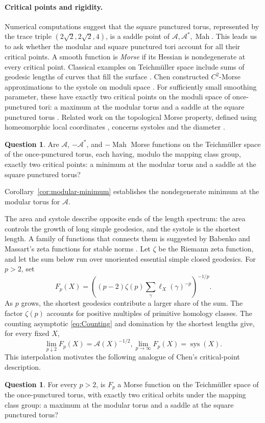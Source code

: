 \documentclass[10pt,twoside]{article}
\theoremstyle{plain}
\theoremstyle{definition}
\newtheorem{question}[theorem]{Question}
\theoremstyle{remark}
\DeclareMathOperator{\sys}{sys}
\newcommand{\A}{\mathcal A}
\begin{document}
\paragraph{Critical points and rigidity.}
Numerical computations suggest that the square punctured
torus, represented by the trace triple $(2\sqrt2,2\sqrt2,4)$,
is a saddle point of $\A,\mathcal A^*,\operatorname{Mah}$.
This leads us to ask whether the modular and square punctured tori
account for all their critical points.
A smooth function is \emph{Morse} if its Hessian is nondegenerate
at every critical point. Classical examples on Teichm\"uller space
include sums of geodesic lengths of curves that fill the surface
\cite{Wolpert1987}.
Chen constructed $C^2$-Morse approximations to the systole on
moduli space \cite{Chen2025Morse}. For sufficiently small smoothing
parameter, these have exactly two critical points on the moduli space
of once-punctured tori: a maximum at the modular torus and a saddle
at the square punctured torus \cite[Section~8.2]{Chen2025Morse}.
Related work on the topological Morse property, defined using
homeomorphic local coordinates \cite{Morse1959}, concerns systoles
\cite{SchmutzSchaller1999,Akrout2003} and the diameter
\cite{IrmerSaha2026}.

\begin{question}\label{qu:morse-invariants}
Are $\A$, $-\A^*$, and $-\operatorname{Mah}$ Morse functions
on the Teichm\"uller space of the once-punctured torus,
each having, modulo the mapping class group, exactly two
critical points: a minimum at the modular torus and a saddle
at the square punctured torus?
\end{question}
Corollary~\ref{cor:modular-minimum} establishes the nondegenerate
minimum at the modular torus for $\A$.

The area and systole describe opposite ends of the length spectrum:
the area controls the growth of long simple geodesics, and the
systole is the shortest length. A family of functions that connects
them is suggested by Babenko and Massart's zeta functions for stable
norms \cite{BabenkoMassart2017}. Let $\zeta$ be the Riemann zeta
function, and let the sum below run over unoriented essential simple
closed geodesics. For $p>2$, set
$$
F_p(X)=
\left(
(p-2)\zeta(p)\sum_\gamma \ell_X(\gamma)^{-p}
\right)^{-1/p}.
$$
As $p$ grows, the shortest geodesics contribute a larger share of
the sum. The factor $\zeta(p)$ accounts for positive multiples of
primitive homology classes.
The counting asymptotic \eqref{eq:Counting} and domination by
the shortest lengths give, for every fixed $X$,
$$
\lim_{p\downarrow2}F_p(X)=\A(X)^{-1/2},
\lim_{p\to\infty}F_p(X)=\sys(X).
$$
This interpolation motivates the following analogue of
Chen's critical-point description.
\begin{question}\label{qu:morse-interpolation}
For every $p>2$, is $F_p$ a Morse function on the
Teichm\"uller space of the once-punctured torus,
with exactly two critical orbits under the mapping class group:
a maximum at the modular torus and a saddle at the
square punctured torus?
\end{question}
\end{document}
